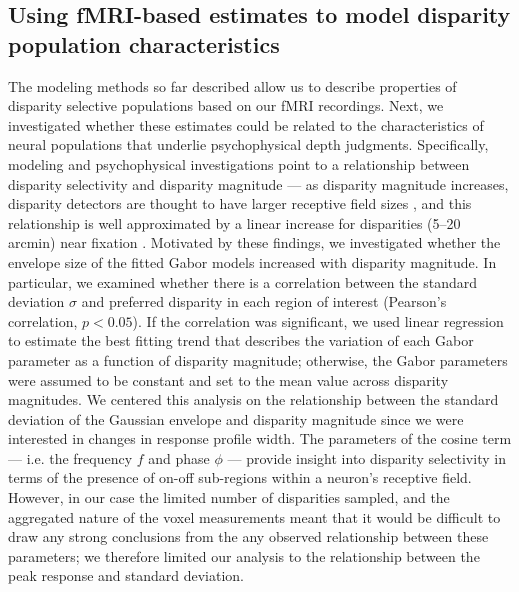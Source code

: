 \subsection{Using fMRI-based estimates to model disparity population characteristics}
The modeling methods so far described allow us to describe properties of disparity selective populations based on our fMRI recordings. Next, we investigated whether these estimates could be related to the characteristics of neural populations that underlie psychophysical depth judgments. Specifically, modeling and psychophysical investigations point to a relationship between disparity selectivity and disparity magnitude --- as disparity magnitude increases, disparity detectors are thought to have larger receptive field sizes \cite{Lehky:1990fk,Stevenson:1992kx}, and this relationship is well approximated by a linear increase for disparities (5--20 arcmin) near fixation \cite{Stevenson:1992kx}. Motivated by these findings, we investigated whether the envelope size of the fitted Gabor models increased with disparity magnitude. In particular, we examined whether there is a correlation between the standard deviation $\sigma$ and preferred disparity in each region of interest (Pearson's correlation, $p<0.05$). If the correlation was significant, we used linear regression to estimate the best fitting trend that describes the variation of each Gabor parameter as a function of disparity magnitude; otherwise, the Gabor parameters were assumed to be constant and set to the mean value across disparity magnitudes. 
We centered this analysis on the relationship between the standard deviation of the Gaussian envelope and disparity magnitude since we were interested in changes in response profile width. The parameters of the cosine term --- i.e. the frequency $f$ and phase $\phi$ --- provide insight into disparity selectivity in terms of the presence of on-off sub-regions within a neuron's receptive field. However, in our case the limited number of disparities sampled, and the aggregated nature of the voxel measurements meant that it would be difficult to draw any strong conclusions from the any observed relationship between these parameters; we therefore limited our analysis to the relationship between the peak response and standard deviation.

